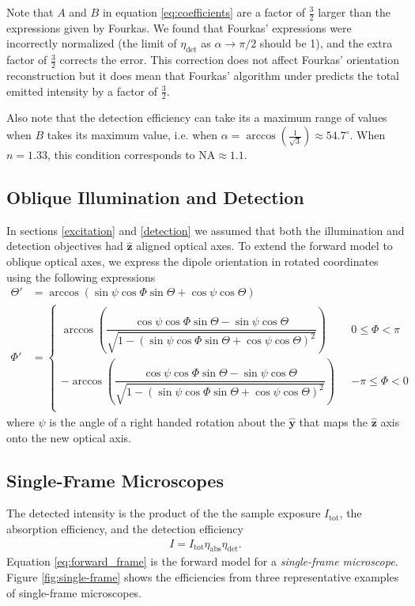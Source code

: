 \documentclass[10pt]{article}
\providecommand{\mh}[1]{\mathbf{\hat{#1}}}
\begin{document}
Note that $A$ and $B$ in equation \ref{eq:coefficients} are a factor of
$\frac{3}{2}$ larger than the expressions given by Fourkas. We found that
Fourkas' expressions were incorrectly normalized (the limit of
$\eta_{\text{det}}$ as $\alpha\rightarrow \pi/2$ should be 1), and the extra
factor of $\frac{3}{2}$ corrects the error. This correction does not affect
Fourkas' orientation reconstruction but it does mean that Fourkas' algorithm
under predicts the total emitted intensity by a factor of $\frac{3}{2}$.

Also note that the detection efficiency can take its a maximum range of values
when $B$ takes its maximum value, i.e. when
$\alpha=\arccos\left(\frac{1}{\sqrt{3}}\right) \approx 54.7^{\circ}$. When $n = 1.33$,
this condition corresponds to $\text{NA} \approx 1.1$.

\subsection{Oblique Illumination and Detection}\label{oblique}
In sections \ref{excitation} and \ref{detection} we assumed that both the
illumination and detection objectives had $\mh{z}$ aligned optical axes. To extend
the forward model to oblique optical axes, we express the dipole orientation in
rotated coordinates using the following expressions
\begin{align}
    \Theta' &= \arccos\left(\sin\psi\cos\Phi\sin\Theta + \cos\psi\cos\Theta\right)\label{eq:thetap}\\
  \Phi' &=
          \begin{cases}
            \arccos\left(\dfrac{\cos\psi\cos\Phi\sin\Theta - \sin\psi\cos\Theta}{\sqrt{1 - (\sin\psi\cos\Phi\sin\Theta + \cos\psi\cos\Theta)^2}}\right) \ \ \ &0 \leq \Phi < \pi  \\
            -\arccos\left(\dfrac{\cos\psi\cos\Phi\sin\Theta - \sin\psi\cos\Theta}{\sqrt{1 - (\sin\psi\cos\Phi\sin\Theta + \cos\psi\cos\Theta)^2}}\right) \ \ \ &-\pi \leq \Phi < 0\\
          \end{cases}
\end{align}
where $\psi$ is the angle of a right handed rotation about the $\mh{y}$ that maps the $\mh{z}$ axis onto the new optical axis. 

\subsection{Single-Frame Microscopes}\label{forward}
The detected intensity is the product of the the sample exposure
$I_{\text{tot}}$, the absorption efficiency, and the detection efficiency
\begin{align}
  I = I_{\text{tot}}\eta_{\text{abs}}\eta_{\text{det}}\label{eq:forward_frame}.
\end{align}
Equation \ref{eq:forward_frame} is the forward model for a \emph{single-frame
  microscope}. Figure \ref{fig:single-frame} shows the efficiencies from three
representative examples of single-frame microscopes.
\end{document}
